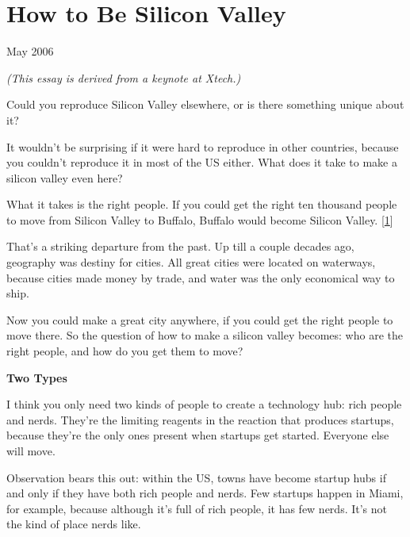 \chapter{How to Be Silicon Valley}


            
              
                

May 2006

\emph{(This essay is derived from a keynote at Xtech.)}

Could you reproduce Silicon Valley elsewhere, or
                  is there something unique about it?

It wouldn't be
                  surprising if it were hard to reproduce in other countries,
                  because you couldn't reproduce it in most of the US either.
                  What does it take to make a silicon valley even here?

What
                  it takes is the right people. If you could get the right ten
                  thousand people to move from Silicon Valley to Buffalo,
                  Buffalo would become Silicon Valley.
                  [\href{\#f1n}{1}]

That's a striking departure from the past. Up
                  till a couple decades ago, geography was destiny for cities.
                  All great cities were located on waterways, because cities
                  made money by trade, and water was the only economical way to
                  ship.

Now you could make a great city anywhere, if
                  you could get the right people to move there. So the question
                  of how to make a silicon valley becomes: who are the right
                  people, and how do you get them to move?

\textbf{Two Types}

I think you only need two kinds of people to
                  create a technology hub: rich people and nerds. They're the
                  limiting reagents in the reaction that produces startups,
                  because they're the only ones present when startups get
                  started. Everyone else will move.

Observation bears
                  this out: within the US, towns have become startup hubs if and
                  only if they have both rich people and nerds. Few startups
                  happen in Miami, for example, because although it's full of
                  rich people, it has few nerds. It's not the kind of place
                  nerds like.

